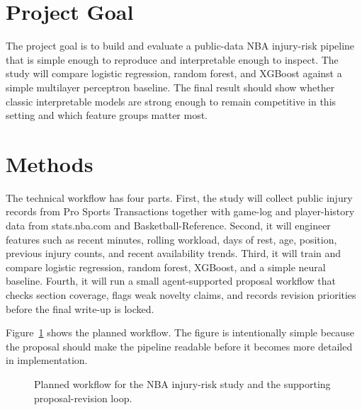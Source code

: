 \documentclass[11pt]{article}
\begin{document}
\section{Project Goal}
The project goal is to build and evaluate a public-data NBA injury-risk pipeline that is simple enough to reproduce and interpretable enough to inspect. The study will compare logistic regression, random forest, and XGBoost against a simple multilayer perceptron baseline. The final result should show whether classic interpretable models are strong enough to remain competitive in this setting and which feature groups matter most.

\section{Methods}
The technical workflow has four parts. First, the study will collect public injury records from Pro Sports Transactions together with game-log and player-history data from stats.nba.com and Basketball-Reference. Second, it will engineer features such as recent minutes, rolling workload, days of rest, age, position, previous injury counts, and recent availability trends. Third, it will train and compare logistic regression, random forest, XGBoost, and a simple neural baseline. Fourth, it will run a small agent-supported proposal workflow that checks section coverage, flags weak novelty claims, and records revision priorities before the final write-up is locked.

Figure~\ref{fig:workflow} shows the planned workflow. The figure is intentionally simple because the proposal should make the pipeline readable before it becomes more detailed in implementation.

\begin{figure}[t]
\centering
{}
\caption{Planned workflow for the NBA injury-risk study and the supporting proposal-revision loop.}
\label{fig:workflow}
\end{figure}
\end{document}
